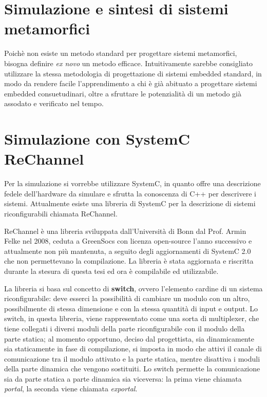 \documentclass[a4paper,titlepage]{book}
\begin{document}
\section{Simulazione e sintesi di sistemi metamorfici}

Poichè non esiste un metodo standard per progettare sistemi metamorfici, bisogna definire \textit{ex novo} un metodo efficace. Intuitivamente sarebbe consigliato utilizzare la stessa metodologia di progettazione di sistemi embedded standard, in modo da rendere facile l'apprendimento a chi è già abituato a progettare sistemi embedded consuetudinari, oltre a sfruttare le potenzialità di un metodo già assodato e verificato nel tempo.

\section{Simulazione con SystemC ReChannel}

Per la simulazione si vorrebbe utilizzare SystemC, in quanto offre una descrizione fedele dell'hardware da simulare e sfrutta la conoscenza di C++ per descrivere i sistemi. Attualmente esiste una libreria di SystemC per la descrizione di sistemi riconfigurabili chiamata ReChannel.

ReChannel è una libreria sviluppata dall'Università di Bonn dal Prof. Armin Felke nel 2008, ceduta a GreenSocs con licenza open-source l'anno successivo e attualmente non più mantenuta, a seguito degli aggiornamenti di SystemC 2.0 che non permettevano la compilazione. La libreria è stata aggiornata e riscritta durante la stesura di questa tesi ed ora è compilabile ed utilizzabile.

La libreria si basa sul concetto di \textbf{switch}, ovvero l'elemento cardine di un sistema riconfigurabile: deve esserci la possibilità di cambiare un modulo con un altro, possibilmente di stessa dimensione e con la stessa quantità di input e output. Lo switch, in questa libreria, viene rappresentato come una sorta di multiplexer, che tiene collegati i diversi moduli della parte riconfigurabile con il modulo della parte statica; al momento opportuno, deciso dal progettista, sia dinamicamente sia staticamente in fase di compilazione, si imposta in modo che attivi il canale di comunicazione tra il modulo attivato e la parte statica, mentre disattiva i moduli della parte dinamica che vengono sostituiti. Lo switch permette la comunicazione sia da parte statica a parte dinamica sia viceversa: la prima viene chiamata \textit{portal}, la seconda viene chiamata \textit{exportal}.
\end{document}
